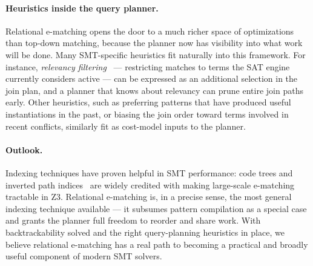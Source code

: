 \paragraph{Heuristics inside the query planner.}
Relational e-matching opens the door to a much richer space of optimizations
than top-down matching, because the planner now has visibility into what work
will be done. Many SMT-specific heuristics fit naturally into this framework.
For instance, \emph{relevancy filtering}~\cite{relevancy} --- restricting
matches to terms the SAT engine currently considers active --- can be
expressed as an additional selection in the join plan, and a planner that
knows about relevancy can prune entire join paths early. Other heuristics, such as preferring patterns
that have produced useful instantiations in the past, or biasing the join
order toward terms involved in recent conflicts, similarly fit as cost-model
inputs to the planner.

\paragraph{Outlook.}
Indexing techniques have proven helpful in SMT
performance: code trees and inverted path indices~\cite{ematchingz3} are widely
credited with making large-scale e-matching tractable in Z3. Relational
e-matching is, in a precise sense, the most general indexing technique
available --- it subsumes pattern compilation as a special case and grants the
planner full freedom to reorder and share work. With backtrackability solved
and the right query-planning heuristics in place, we believe relational
e-matching has a real path to becoming a practical and broadly useful
component of modern SMT solvers.
